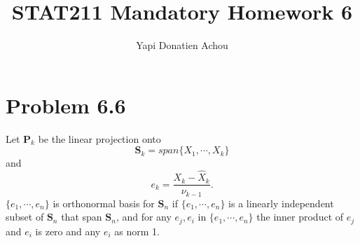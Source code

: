 \documentclass[11pt, oneside]{article}   	%
\title{STAT211 Mandatory Homework 6}
\author{Yapi Donatien Achou}
\begin{document}
\maketitle
\tableofcontents
\newpage
 
\section{Problem 6.6}
Let $\textbf{P}_{k}$ be the linear projection onto
\begin{equation}\label{eq:e}
\textbf{S}_{k} = span\{ X_{1},\cdots, X_{k}  \}
\end{equation}
and 
\begin{equation}\label{eq:e0}
e_{k} = \frac{X_{k}-\hat{X}_{k}}{\nu_{k-1}}.
\end{equation}
$\{e_{1},\cdots,e_{n}\}$
is orthonormal basis for $\textbf{S}_{n}$ if $\{e_{1},\cdots,e_{n}\}$ is a linearly independent subset of $\textbf{S}_{n}$ that span $\textbf{S}_{n}$, and for any $e_{j}, e_{i}$ in $\{e_{1},\cdots,e_{n}\}$
the inner product of $e_{j}$ and $e_{i}$ is zero and any $e_{i}$ as norm 1.
\justify
\end{document}
